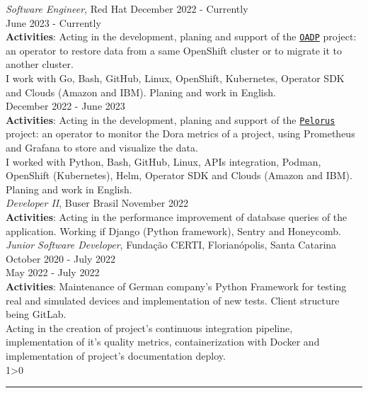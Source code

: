 \documentclass[a4paper,10pt]{article}
\newcommand{\createSection}[4][0]{
	\begin{tcolorbox}[
        blanker,
        breakable,
        title=\begin{minipage}{0.16\linewidth}\large{\textbf{#2}}\vspace{-#3\baselineskip}\end{minipage},
        coltitle=black,
        leftupper=0.21\linewidth,
    ]
        #4
		\ifnum0#1>0 { \hrule {\ } } \fi
    \end{tcolorbox}
}
\begin{document}
	\createSection[1]{Experience}{2}{
     \textit{Software Engineer}, Red Hat \hfill December 2022 - Currently \\
        June 2023 - Currently\\
        \textbf{Activities}: Acting in the development, planing and support of the \href{https://github.com/openshift/oadp-operator/}{\texttt{OADP}} project: an operator to restore data from a same OpenShift cluster or to migrate it to another cluster.\\

        I work with Go, Bash, GitHub, Linux, OpenShift, Kubernetes, Operator SDK and Clouds (Amazon and IBM). Planing and work in English.\\

        December 2022 - June 2023\\
        \textbf{Activities}: Acting in the development, planing and support of the \href{https://github.com/dora-metrics/pelorus/}{\texttt{Pelorus}} project: an operator to monitor the Dora metrics of a project, using Prometheus and Grafana to store and visualize the data.\\

        I worked with Python, Bash, GitHub, Linux, APIs integration, Podman, OpenShift (Kubernetes), Helm, Operator SDK and Clouds (Amazon and IBM). Planing and work in English.\\

        \textit{Developer II}, Buser Brasil \hfill November 2022 \\
        \textbf{Activities}: Acting in the performance improvement of database queries of the application. Working if Django (Python framework), Sentry and Honeycomb.\\

	    \textit{Junior Software Developer}, Fundação CERTI, Florianópolis, Santa Catarina \hfill October 2020 - July 2022 \\
	    May 2022 - July 2022\\
        \textbf{Activities}: Maintenance of German company's Python Framework for testing real and simulated devices and implementation of new tests. Client structure being GitLab.\\

        Acting in the creation of project's continuous integration pipeline, implementation of it's quality metrics, containerization with Docker and implementation of project's documentation deploy.\\

}
\end{document}
